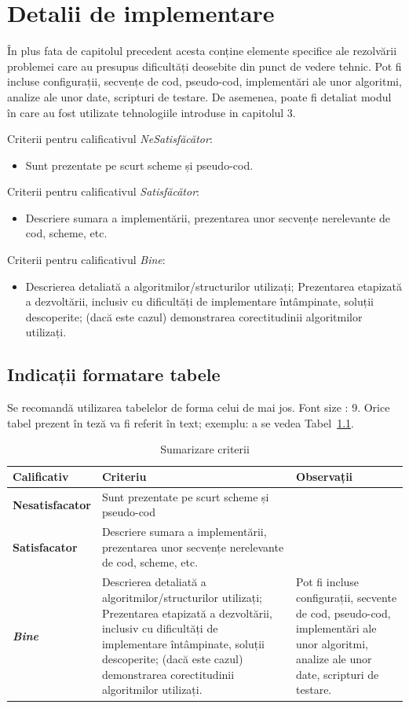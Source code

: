 \documentclass[12pt,a4paper]{report}
\begin{document}
\chapter{Detalii de implementare}
În plus fata de capitolul precedent acesta conține elemente specifice ale rezolvării problemei care au presupus dificultăți deosebite din punct de vedere tehnic. Pot fi incluse configurații, secvențe de cod, pseudo-cod, implementări ale unor algoritmi, analize ale unor date, scripturi de testare. De asemenea, poate fi detaliat modul în care au fost utilizate tehnologiile introduse in capitolul 3.


Criterii pentru calificativul \textit{Ne\textit{Satisfăcător}}: 
\begin{itemize}
	\item	Sunt prezentate pe scurt scheme și pseudo-cod.
\end{itemize}
Criterii pentru calificativul \textit{Satisfăcător}: 
\begin{itemize}
	\item	Descriere sumara a implementării, prezentarea unor secvențe nerelevante de cod, scheme, etc. 
\end{itemize}
Criterii pentru calificativul \textit{Bine}: 
\begin{itemize}
	\item	Descrierea detaliată a algoritmilor/structurilor utilizați; Prezentarea etapizată a dezvoltării, inclusiv cu dificultăți de implementare întâmpinate, soluții descoperite; (dacă este cazul) demonstrarea corectitudinii algoritmilor utilizați. 
\end{itemize}

\section{Indicații formatare tabele}
Se recomandă utilizarea tabelelor de forma celui de mai jos.  Font size :  9. 
Orice tabel prezent în teză va fi referit în text; exemplu: a se vedea Tabel~\ref{tab:criterii}.

\begin{table}[th]\small\linespread{1}
\caption{Sumarizare criterii}
\label{tab:criterii}
\begin{tabular}{l >{\raggedright\arraybackslash}p{8cm} >{\raggedright\arraybackslash}p{4cm}}
\textbf{Calificativ} & \textbf{Criteriu} & \textbf{Observații} \\\hline
\textbf{Nesatisfacator} & Sunt prezentate pe scurt scheme și pseudo-cod & \\\hline
\textbf{Satisfacator} &Descriere sumara a implementării, prezentarea unor secvențe nerelevante de cod, scheme, etc.& \\
\hline
\textbf{\textit{Bine}} &Descrierea detaliată a algoritmilor/structurilor utilizați; Prezentarea etapizată a dezvoltării, inclusiv cu dificultăți de implementare întâmpinate, soluții descoperite; (dacă este cazul) demonstrarea corectitudinii algoritmilor utilizați. & Pot fi incluse configurații, secvente de cod, pseudo-cod, implementări ale unor algoritmi, analize ale unor date, scripturi de testare. \\
\hline
\end{tabular}
\end{table}
\end{document}
